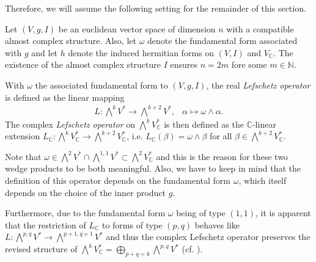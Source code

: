 Therefore, we will assume the following setting for the remainder of this section.
\begin{set}
	Let $(V,g, I)$ be an euclidean vector space of dimension $n$ with a compatible almost complex
	structure. Also, let $\omega$ denote the fundamental form associated with $g$ and let $h$ denote
	the induced hermitian forms on $(V,I)$ and $V_\mathbb{C}$. The existence of the almost complex
	structure $I$ ensures $n = 2m$ fore some $m \in \mathbb{N}$.
\end{set}
\begin{defn}
	With $\omega$ the associated fundamental form to $(V,g,I)$, the real \emph{Lefschetz operator} is
	defined as the linear mapping
	\begin{align*}
		L: \bigwedge\nolimits^k V^* \rightarrow \bigwedge\nolimits^{k+2} V^*,\;\enspace
		\alpha \mapsto \omega \wedge \alpha.
	\end{align*}
	The complex \emph{Lefschetz operator} on $\bigwedge\nolimits^kV^*_\mathbb{C}$ is then
	defined as the $\mathbb{C}$-linear extension $L_\mathbb{C}: \bigwedge\nolimits^k V^*_\mathbb{C}
	\rightarrow \bigwedge\nolimits^{k+2} V^*_\mathbb{C}$, i.e. $L_\mathbb{C}(\beta) = \omega \wedge
	\beta$ for all $\beta \in \bigwedge\nolimits^{k+2} V^*_\mathbb{C}$.
\end{defn}
\begin{rem}
	Note that $\omega \in \bigwedge\nolimits^2 V^* \cap \bigwedge\nolimits^{1,1}
	V^*\subset\bigwedge\nolimits^2V_\mathbb{C}^*$ and this is the reason for these two wedge products 
	to be both meaningful. Also, we have to keep in mind that the definition of this operator depends on the 
	fundamental form $\omega$, which itself depends on the choice of the inner product $g$.
	
	Furthermore, due to  the fundamental form $\omega$ being of type $(1,1)$, it is apparent that the
	restriction of $L_\mathbb{C}$ to forms of type $(p,q)$ behaves like 
	$L: \bigwedge\nolimits^{p,q} V^* \rightarrow \bigwedge\nolimits^{p+1,q+1}V^*$
	and thus the complex Lefschetz operator preserves the revised structure of 
	$\bigwedge\nolimits^k V_\mathbb{C}^* = \bigoplus_{p+q=k}\bigwedge\nolimits^{p,q}V^*$ 
	(cf. \cite[Proposition 1.2.8 (ii)]{Huybrechts2004}).
\end{rem}

